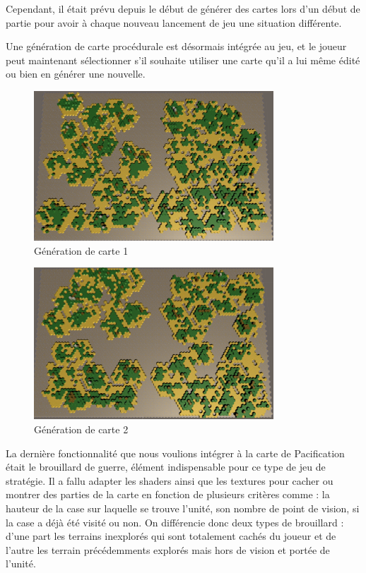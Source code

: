 \documentclass[12pt]{report}
\begin{document}
Cependant, il était prévu depuis le début de générer des cartes lors d'un début
de partie pour avoir à chaque nouveau lancement de jeu une situation différente.

Une génération de carte procédurale est désormais intégrée au jeu, et le joueur
peut maintenant sélectionner s'il souhaite utiliser une carte qu'il a lui même
édité ou bien en générer une nouvelle.

\begin{figure}[H]
    \centering
    \includegraphics[width=0.8\textwidth]{MapGen1}
    \caption{Génération de carte 1}
\end{figure}

\begin{figure}[H]
    \centering
    \includegraphics[width=0.8\textwidth]{MapGen2}
    \caption{Génération de carte 2}
\end{figure}

La dernière fonctionnalité que nous voulions intégrer à la carte de Pacification
était le brouillard de guerre, élément indispensable pour ce type de jeu de
stratégie. Il a fallu adapter les shaders ainsi que les textures pour cacher ou
montrer des parties de la carte en fonction de plusieurs critères comme : la
hauteur de la case sur laquelle se trouve l'unité, son nombre de point de
vision, si la case a déjà été visité ou non. On différencie donc deux types de
brouillard : d'une part les terrains inexplorés qui sont totalement cachés du
joueur et de l'autre les terrain précédemments explorés mais hors de vision et
portée de l'unité.
\end{document}
